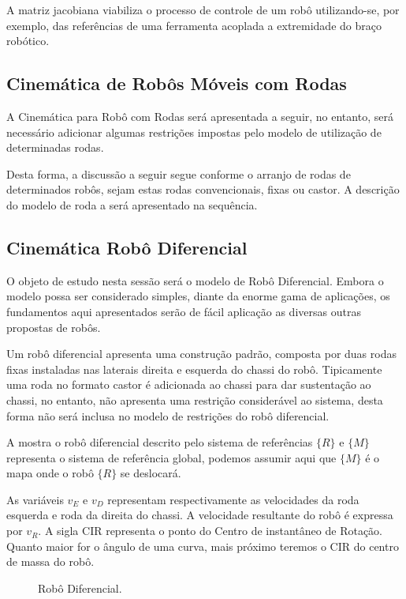 A matriz jacobiana viabiliza o processo de controle de um robô utilizando-se, por exemplo, das referências de uma ferramenta acoplada a
extremidade do braço robótico.

\subsection{Cinemática de Robôs Móveis com Rodas}

A Cinemática para Robô com Rodas será apresentada a seguir, no entanto, será necessário adicionar algumas restrições impostas pelo modelo de utilização de determinadas rodas.

Desta forma, a discussão a seguir segue conforme o arranjo de rodas de determinados robôs, sejam estas rodas convencionais, fixas ou castor. A descrição do modelo de roda a será apresentado na sequência.

\subsection{Cinemática Robô Diferencial}

O objeto de estudo nesta sessão será o modelo de Robô Diferencial. Embora o modelo possa ser considerado simples, diante da enorme gama de aplicações, os fundamentos aqui apresentados serão de fácil aplicação as diversas outras propostas de robôs.

Um robô diferencial apresenta uma construção padrão, composta por duas rodas fixas instaladas nas laterais direita e esquerda do chassi do robô. Tipicamente uma roda no formato castor é adicionada ao chassi para dar sustentação ao chassi, no entanto, não apresenta uma restrição considerável ao sistema, desta forma não será inclusa no modelo de restrições do robô diferencial.

A  mostra o robô diferencial descrito pelo sistema de referências $\{R\}$ e $\{M\}$ representa o sistema de referência global, podemos assumir aqui que $\{M\}$ é o mapa onde o robô $\{R\}$ se deslocará.

As variáveis $v_{E}$ e $v_{D}$ representam respectivamente as velocidades da roda esquerda e roda da direita do chassi. A velocidade resultante do robô é expressa por $v_{R}$.
A sigla $\text{CIR}$ representa o ponto do Centro de instantâneo de Rotação. Quanto maior for o ângulo de uma curva, mais próximo teremos o $\text{CIR}$ do centro de massa do robô.

\begin{figure}[!ht]
    \centering
    
    \caption{Robô Diferencial.}
    \label{fig:car01}
\end{figure}


